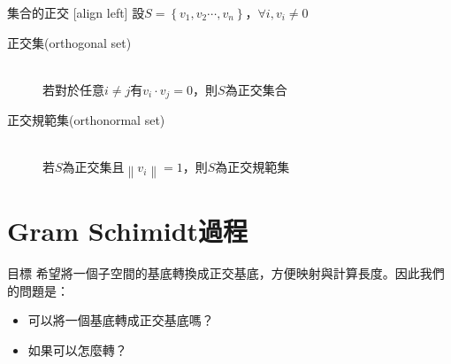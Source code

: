 \documentclass[14pt]{beamer}
\begin{document}
\begin{frame}[fragile]{集合的正交}
	[align left]
	設$S=\left\{v_{1} ,v_{2} \cdots ,v_{n} \right\}$，$\forall i,v_{i} \ne 0$\\
	\begin{description}
		\item[正交集(orthogonal set)] \hfill \\若對於任意$i\ne j$有$v_{i} \cdot v_{j} =0$，則$S$為正交集合
		\item[正交規範集(orthonormal set)] \hfill \\
		若$S$為正交集且$\left\| v_{i} \right\| =1$，則$S$為正交規範集
	\end{description}
\end{frame}


\section{Gram Schimidt過程}

\begin{frame}{目標}
	希望將一個子空間的基底轉換成正交基底，方便映射與計算長度。因此我們的問題是：
	\begin{itemize}
		\item 可以將一個基底轉成正交基底嗎？
		\item 如果可以怎麼轉？
	\end{itemize}
	
\end{frame}
\end{document}
